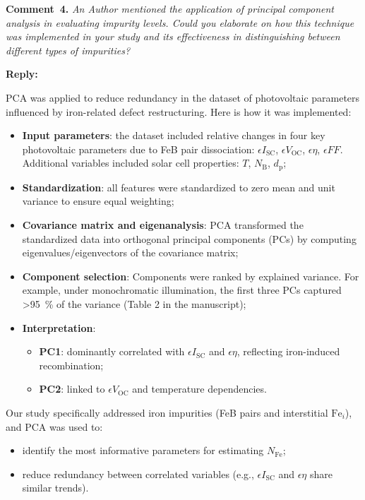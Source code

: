 \documentclass[a4paper,fleqn]{cas-sc}
\begin{document}
\vspace{1cm}
\noindent
\textcolor[rgb]{0.00,0.50,1.00}{\textbf{Comment~4.}}
\emph{An Author mentioned the application of principal component analysis in evaluating impurity levels. Could you elaborate on how this technique was implemented in your study and its effectiveness in distinguishing between different types of impurities?}

\noindent
\textcolor[rgb]{0.51,0.00,0.00}{\textbf{Reply:}}

PCA was applied to reduce redundancy in the dataset of photovoltaic parameters influenced by iron-related defect restructuring. Here is how it was implemented:

\begin{itemize}
    \item \textbf{Input parameters}: the dataset included relative changes in four key photovoltaic parameters due to FeB pair dissociation: $\epsilon I_\mathrm{SC}$, $\epsilon V_\mathrm{OC}$, $\epsilon \eta$, $\epsilon FF$. Additional variables included solar cell properties: $T$, $N_\mathrm{B}$, $d_\mathrm{p}$;
    \item \textbf{Standardization}: all features were standardized to zero mean and unit variance to ensure equal weighting;
    \item \textbf{Covariance matrix and eigenanalysis}: PCA transformed the standardized data into orthogonal principal components (PCs) by computing eigenvalues/eigenvectors of the covariance matrix;
    \item \textbf{Component selection}: 
    Components were ranked by explained variance. 
    For example, under monochromatic illumination, the first three PCs captured >95~\% of the variance (Table 2 in the manuscript);
    \item \textbf{Interpretation}:
    \begin{itemize}
    \item \textbf{PC1}: dominantly correlated with $\epsilon I_\mathrm{SC}$ and $\epsilon \eta$, reflecting iron-induced recombination;
    \item \textbf{PC2}: linked to $\epsilon V_\mathrm{OC}$ and temperature dependencies.
    \end{itemize}
\end{itemize}

Our study specifically addressed iron impurities (FeB pairs and interstitial $\mathrm{Fe}_i$), and PCA was used to:

\begin{itemize}
    \item identify the most informative parameters for estimating $N_\mathrm{Fe}$;
    \item reduce redundancy between correlated variables (e.g., $\epsilon I_\mathrm{SC}$ and $\epsilon \eta$ share similar trends).
\end{itemize}
\end{document}
